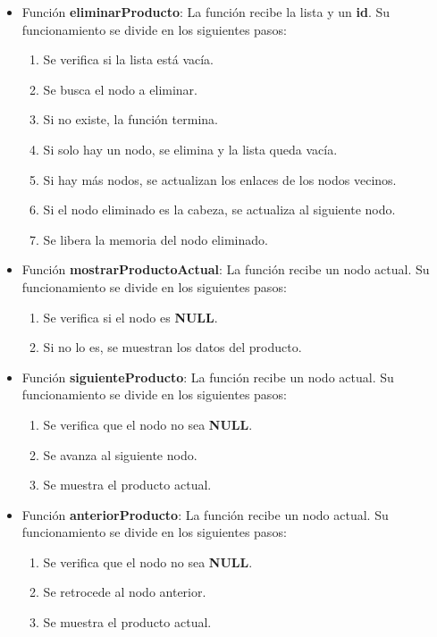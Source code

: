 \documentclass[letterpaper,12pt,oneside]{article}
\begin{document}
\begin{itemize}
\item Función \textbf{eliminarProducto}: La función recibe la lista y un \textbf{id}. Su funcionamiento se divide en los siguientes pasos:
\begin{enumerate}
    \item Se verifica si la lista está vacía.
    \item Se busca el nodo a eliminar.
    \item Si no existe, la función termina.
    \item Si solo hay un nodo, se elimina y la lista queda vacía.
    \item Si hay más nodos, se actualizan los enlaces de los nodos vecinos.
    \item Si el nodo eliminado es la cabeza, se actualiza al siguiente nodo.
    \item Se libera la memoria del nodo eliminado.
\end{enumerate}

\item Función \textbf{mostrarProductoActual}: La función recibe un nodo actual. Su funcionamiento se divide en los siguientes pasos:
\begin{enumerate}
    \item Se verifica si el nodo es \textbf{NULL}.
    \item Si no lo es, se muestran los datos del producto.
\end{enumerate}

\item Función \textbf{siguienteProducto}: La función recibe un nodo actual. Su funcionamiento se divide en los siguientes pasos:
\begin{enumerate}
    \item Se verifica que el nodo no sea \textbf{NULL}.
    \item Se avanza al siguiente nodo.
    \item Se muestra el producto actual.
\end{enumerate}

\item Función \textbf{anteriorProducto}: La función recibe un nodo actual. Su funcionamiento se divide en los siguientes pasos:
\begin{enumerate}
    \item Se verifica que el nodo no sea \textbf{NULL}.
    \item Se retrocede al nodo anterior.
    \item Se muestra el producto actual.
\end{enumerate}


\end{itemize}
\end{document}
